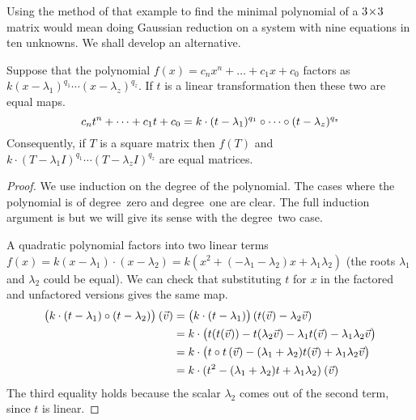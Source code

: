Using the method of that example to find the minimal polynomial of a
\( 3 \! \times \! 3 \) matrix 
would mean doing Gaussian reduction on
a system with nine equations in ten unknowns.
We shall develop an alternative.

\begin{lemma} \label{le:PolyMapsFactor}
Suppose that the polynomial \( f(x)=c_nx^n+\dots+c_1x+c_0 \) factors as
\( k(x-\lambda_1)^{q_1}\cdots(x-\lambda_z)^{q_z} \).
If \( t \) is a linear transformation then these two are equal maps. 
\begin{equation*}
  c_nt^n+\dots+c_1t+c_0
  =
  k\cdot(t-\lambda_1)^{q_1}\mathbin{\circ} \cdots\mathbin{\circ} 
      (t-\lambda_z)^{q_z} 
\end{equation*}
Consequently, if \( T \) is a square matrix then \( f(T) \) and
\( k\cdot(T-\lambda_1I)^{q_1}\cdots(T-\lambda_z I)^{q_z} \) 
are equal matrices.
\end{lemma}

\begin{proof}
We use induction on the degree of the polynomial.
The cases where the polynomial is of
degree~zero and degree~one are clear.
The full induction argument is 
but we will give its sense with the degree~two case.

A quadratic polynomial factors into two
linear terms \( f(x)=k(x-\lambda_1)\cdot(x-\lambda_2)
                    =k(x^2+(-\lambda_1-\lambda_2)x+\lambda_1\lambda_2) \)
(the roots $\lambda_1$ and $\lambda_2$ could be equal).
We can check that substituting \( t \) 
for \( x \) in the factored and
unfactored versions gives the same map.
\begin{align*}
   \bigl(k\cdot(t-\lambda_1)\mathbin{\circ} (t-\lambda_2)\bigr)\>(\vec{v})
   &=\bigl(k\cdot(t-\lambda_1)\bigr)\,(t(\vec{v})-\lambda_2\vec{v})    \\
   &=k\cdot\bigl(t(t(\vec{v}))-t(\lambda_2\vec{v})
      -\lambda_1 t(\vec{v})-\lambda_1\lambda_2\vec{v}\bigr)    \\
   &=k\cdot \bigl(t\mathbin{\circ} t\,(\vec{v})-(\lambda_1+\lambda_2)t(\vec{v})
          +\lambda_1\lambda_2\vec{v}\bigr)                    \\
   &=k\cdot(t^2-(\lambda_1+\lambda_2)t+\lambda_1\lambda_2)\>(\vec{v})
\end{align*}
The third equality holds because the scalar $\lambda_2$  comes out of the
second term, since \( t \) is linear.
\end{proof}

